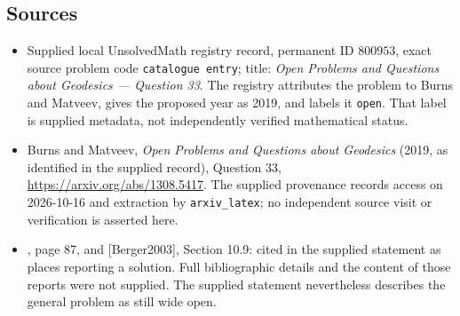 \documentclass[11pt]{article}
\begin{document}
\subsection{Sources}
\begin{itemize}
\item Supplied local UnsolvedMath registry record, permanent ID \(800953\), exact source problem code \texttt{catalogue entry}; title: \emph{Open Problems and Questions about Geodesics --- Question 33}. The registry attributes the problem to Burns and Matveev, gives the proposed year as 2019, and labels it \texttt{open}. That label is supplied metadata, not independently verified mathematical status.
\item Burns and Matveev, \emph{Open Problems and Questions about Geodesics} (2019, as identified in the supplied record), Question 33, \url{https://arxiv.org/abs/1308.5417}. The supplied provenance records access on 2026-10-16 and extraction by \texttt{arxiv\_latex}; no independent source visit or verification is asserted here.
\item [Berger2000], page 87, and [Berger2003], Section 10.9: cited in the supplied statement as places reporting a solution. Full bibliographic details and the content of those reports were not supplied. The supplied statement nevertheless describes the general problem as still wide open.
\end{itemize}
\end{document}
